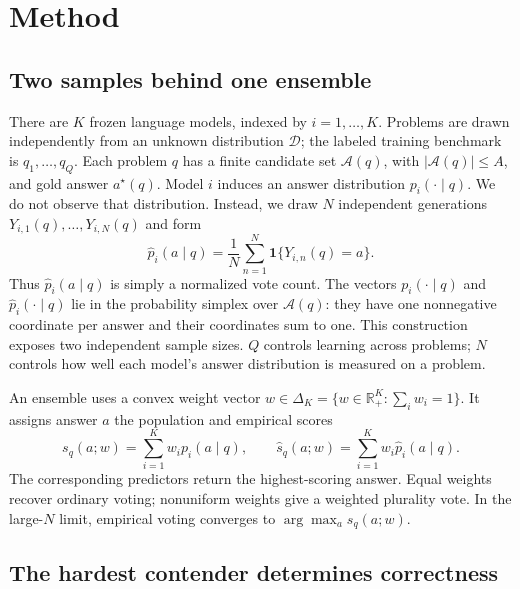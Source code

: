 \section{Method}
\label{sec:method}

\subsection{Two samples behind one ensemble}
\label{sec:method-setup}

There are \(K\) frozen language models, indexed by \(i=1,\ldots,K\).
Problems are drawn independently from an unknown distribution \(\mathcal D\);
the labeled training benchmark is \(q_1,\ldots,q_Q\).  Each problem \(q\) has a
finite candidate set \(\mathcal A(q)\), with
\(|\mathcal A(q)|\le A\), and gold answer \(a^\star(q)\).
Model \(i\) induces an answer distribution \(p_i(\cdot\mid q)\).  We do not
observe that distribution.  Instead, we draw \(N\) independent generations
\(Y_{i,1}(q),\ldots,Y_{i,N}(q)\) and form
\begin{equation}
\widehat p_i(a\mid q)
=
\frac1N\sum_{n=1}^N\mathbf 1\{Y_{i,n}(q)=a\}.
\label{eq:phat}
\end{equation}
Thus \(\widehat p_i(a\mid q)\) is simply a normalized vote count.  The vectors
\(p_i(\cdot\mid q)\) and \(\widehat p_i(\cdot\mid q)\) lie in the probability
simplex over \(\mathcal A(q)\): they have one nonnegative coordinate per answer
and their coordinates sum to one.  This construction exposes two independent
sample sizes.  \(Q\) controls learning across problems; \(N\) controls how well
each model's answer distribution is measured on a problem.

An ensemble uses a convex weight vector
\(w\in\Delta_K=\{w\in\mathbb R_+^K:\sum_iw_i=1\}\).  It assigns answer \(a\)
the population and empirical scores
\begin{equation}
s_q(a;w)=\sum_{i=1}^K w_i p_i(a\mid q),
\qquad
\widehat s_q(a;w)=\sum_{i=1}^K w_i\widehat p_i(a\mid q).
\label{eq:scores}
\end{equation}
The corresponding predictors return the highest-scoring answer.  Equal
weights recover ordinary voting; nonuniform weights give a weighted plurality
vote.  In the large-\(N\) limit, empirical voting converges to
\(\arg\max_a s_q(a;w)\).

\subsection{The hardest contender determines correctness}
\label{sec:method-margin}

